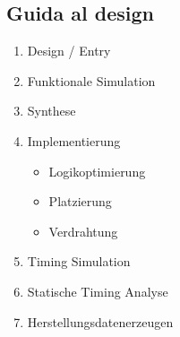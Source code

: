     \subsection{Guida al design}
        \begin{minipage}[t]{0.48\columnwidth}
            \vspace{0pt} %
            \begin{enumerate}
                \item Design / Entry
                \item Funktionale Simulation
                \item Synthese
                \item Implementierung
                \begin{itemize}
                    \item Logikoptimierung
                    \item Platzierung
                    \item Verdrahtung
                \end{itemize}
                \item Timing Simulation
                \item Statische Timing Analyse
                \item Herstellungsdatenerzeugen
            \end{enumerate}
        \end{minipage}
        \hfill
